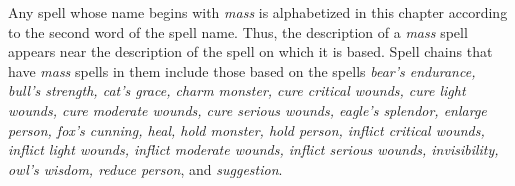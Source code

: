 
Any spell whose name begins with \textit{mass} is alphabetized in this chapter 
according to the second word of the spell name. Thus, the description of a \textit{mass 
}spell appears near the description of the spell on which it is based. Spell chains 
that have \textit{mass} spells in them include those based on the spells \textit{bear's 
endurance, bull's strength, cat's grace, charm monster, cure critical wounds, cure 
light wounds, cure moderate wounds, cure serious wounds, eagle's splendor, enlarge 
person, fox's cunning, heal, hold monster, hold person, inflict critical wounds, 
inflict light wounds, inflict moderate wounds, inflict serious wounds, invisibility, 
owl's wisdom, reduce person}, and \textit{suggestion}.

